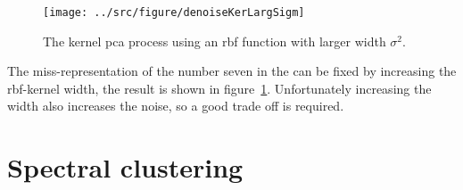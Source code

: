 \begin{figure}
\centering
\texttt{[image: ../src/figure/denoiseKerLargSigm]}
\caption{The kernel pca process using an rbf function with larger width $\sigma^2$.}
\label{fig:denoiseKerLargSigm}
\end{figure}
The miss-representation of the number seven in the can be fixed by increasing the rbf-kernel width, the result is shown in figure~\ref{fig:denoiseKerLargSigm}. Unfortunately increasing the width also increases the noise, so a good trade off is required. 



\section{Spectral clustering}